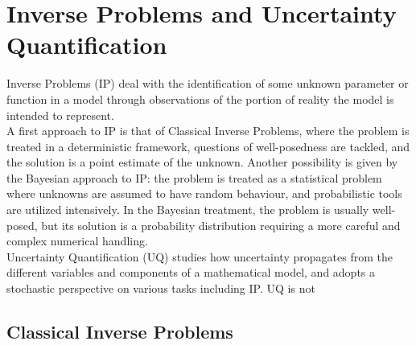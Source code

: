 \section{Inverse Problems and Uncertainty Quantification} \label{sec:IPUQ}
Inverse Problems (IP) deal with the identification of some unknown parameter or function in a model through observations of the portion of reality the model is intended to represent. \\
A first approach to IP is that of Classical Inverse Problems, where the problem is treated in a deterministic framework, questions of well-posedness are tackled, and the solution is a point estimate of the unknown.
Another possibility is given by the Bayesian approach to IP: the problem is treated as a statistical problem where unknowns are assumed to have random behaviour, and probabilistic tools are utilized intensively. 
In the Bayesian treatment, the problem is usually well-posed, but its solution is a probability distribution requiring a more careful and complex numerical handling.\\
Uncertainty Quantification (UQ) studies how uncertainty propagates from the different variables and components of a mathematical model, and adopts a stochastic perspective on various tasks including IP. 
UQ is not
\subsection{Classical Inverse Problems}\label{sec:IP}
\lipsum